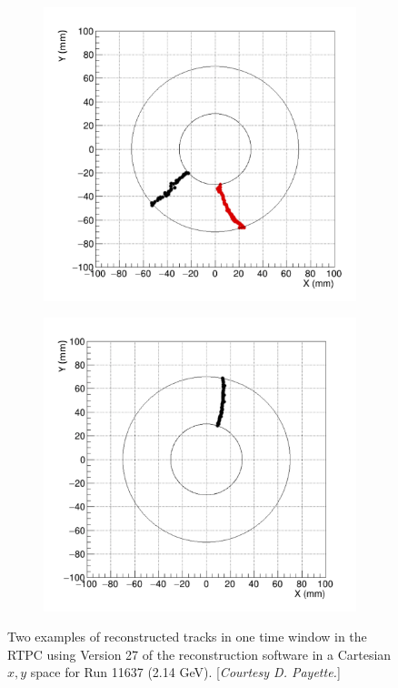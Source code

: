 \begin{figure}[h!]
	\centering
	\begin{subfigure}[b]{0.44\linewidth}
		\includegraphics[width=\linewidth]{figures/RTPC_tracks_11637_1.png}
	\end{subfigure}
	\begin{subfigure}[b]{0.44\textwidth}
		\includegraphics[width=\linewidth]{figures/RTPC_tracks_11637_2.png}
	\end{subfigure}
	\caption{Two examples of reconstructed tracks in one time window in the RTPC using Version 27 of the reconstruction software in a Cartesian $x,y$ space for Run 11637 (2.14 GeV). [\textit{Courtesy D. Payette.}]}
	\label{fig:rtpc_tracks_11637}
\end{figure}
